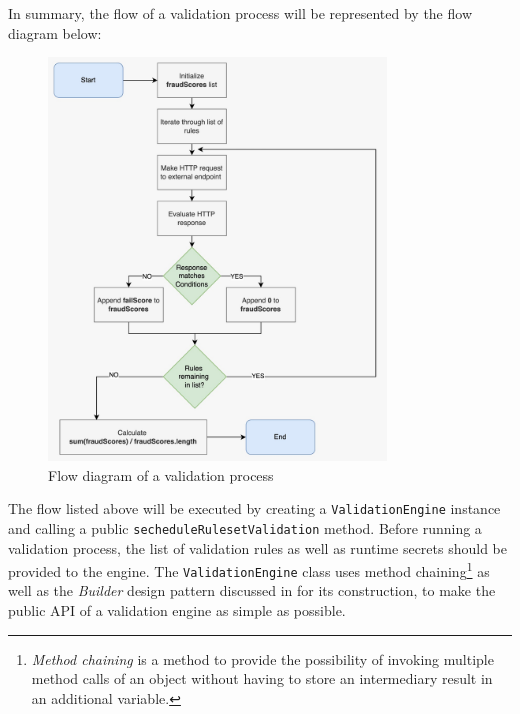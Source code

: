       In summary, the flow of a validation process will be represented by the flow diagram below:

      \begin{figure}[!ht]
        \centering
        \includegraphics[width=0.8\textwidth]{diagrams/flow_validation_process.jpeg}
        \caption{Flow diagram of a validation process}
        \label{fig:flow_validation}
      \end{figure}
      
      The flow listed above will be executed by creating a \verb;ValidationEngine; instance and calling a public \verb;secheduleRulesetValidation; method. Before running a validation process, the list of validation rules as well as runtime secrets should be provided to the engine. The \verb;ValidationEngine; class uses method chaining\footnote{\emph{Method chaining} is a method to provide the possibility of invoking multiple method calls of an object without having to store an intermediary result in an additional variable.} as well as the \emph{Builder} design pattern discussed in \autocite[pp. 97-106]{gamma-1995} for its construction, to make the public API of a validation engine as simple as possible.

